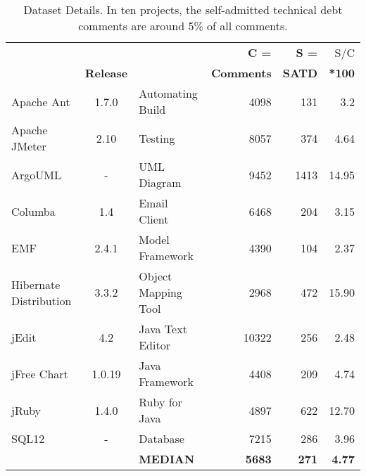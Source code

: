 \begin{table}[!t]
\small
\centering
\caption{Dataset Details. In ten projects,
the self-admitted technical debt comments are around 5\% of
all comments.}
\label{table dataset details}
\begin{tabular}{|p{0.4in}cp{0.3in}rrr|}\hline
   & 
  & 
  & 
\textbf{C = } &
\textbf{S = } & S/C\\
 & 
\textbf{Release} & 
\textbf{ ~} & 
\textbf{Comments} &
\textbf{SATD} &
\textbf{*100}\\
\hline
Apache Ant & 
1.7.0 & 
Automating Build&
4098 &
131 &
3.2\\
\hline
Apache JMeter & 
2.10 & 
Testing &
8057 &
374 &
4.64\\
\hline
ArgoUML & 
- & 
UML Diagram &
9452 &
1413 &
14.95 \\
\hline
Columba & 
1.4 & 
Email Client &
6468 &
204 &
3.15 \\
\hline
EMF & 
2.4.1 & 
Model Framework &
4390 &
104 &
2.37 \\
\hline
Hibernate Distribution & 
3.3.2 & 
Object Mapping Tool &
2968 &
472 &
15.90 \\
\hline
jEdit & 
4.2 & 
Java Text Editor &
10322 &
256 &
2.48 \\
\hline
jFree Chart & 
1.0.19 & 
Java Framework &
4408 &
209 &
4.74 \\
\hline
jRuby & 
1.4.0 & 
Ruby for Java &
4897 &
622 &
12.70 \\
\hline
SQL12 & 
- & 
Database &
7215 &
286 &
3.96 \\
\hline
 & 
 
 & \textbf{MEDIAN}
 &
\textbf{5683} &
\textbf{271} &
\textbf{4.77} \\\hline
\end{tabular}

\end{table}